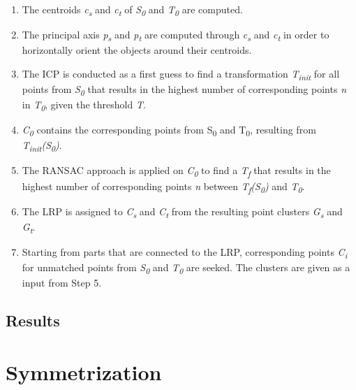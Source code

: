 \begin{enumerate}
	\item The centroids \textit{c\textsubscript{s}} and \textit{c\textsubscript{t}} of \textit{S\textsubscript{0}} and \textit{T\textsubscript{0}} are computed.
	
	\item The principal axis \textit{p\textsubscript{s}} and \textit{p\textsubscript{t}}  are computed through \textit{c\textsubscript{s}} and \textit{c\textsubscript{t}} in order to horizontally orient the objects around their centroids.
	
	\item The ICP is conducted as a first guess to find a transformation \textit{T\textsubscript{init}} for all points from \textit{S\textsubscript{0}} that results in the highest number of corresponding points \textit{n} in \textit{T\textsubscript{0}}, given the threshold \textit{T}.
	
	\item \textit{C\textsubscript{0}} contains the corresponding points from S\textsubscript{0} and T\textsubscript{0}, resulting from \textit{T\textsubscript{init}(S\textsubscript{0})}.
	
	\item The RANSAC approach is applied on \textit{C\textsubscript{0}} to find a  \textit{T\textsubscript{f}} that results in the highest number of corresponding points \textit{n} between \textit{T\textsubscript{f}(S\textsubscript{0})} and \textit{T\textsubscript{0}}.
	
	\item The LRP is assigned to \textit{C\textsubscript{s}} and \textit{C\textsubscript{t}} from the resulting point clusters \textit{G\textsubscript{s}} and \textit{G\textsubscript{t}}.
	
	\item Starting from parts that are connected to the LRP, corresponding points \textit{C\textsubscript{i}} for unmatched points from \textit{S\textsubscript{0}} and \textit{T\textsubscript{0}} are seeked. The clusters are given as a input from Step 5. 
		
\end{enumerate}

\subsection{Results}

\section{Symmetrization}

